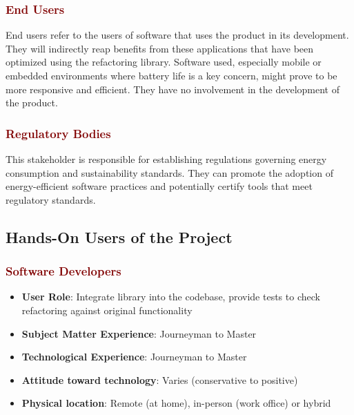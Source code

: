 \documentclass[12pt]{article}
\begin{document}
\subsubsection*{\textcolor{Maroon}{End Users}}
End users refer to the users of software that uses the product in its development. They will indirectly reap benefits from these applications that have been optimized using the refactoring library. Software used, especially mobile or embedded environments where battery life is a key concern, might prove to be more responsive and efficient. They have no involvement in the development of the product. 

\subsubsection*{\textcolor{Maroon}{Regulatory Bodies}}
This stakeholder is responsible for establishing regulations governing energy consumption and sustainability standards. They can promote the adoption of energy-efficient software practices and potentially certify tools that meet regulatory standards. 

\subsection{Hands-On Users of the Project}
\subsubsection*{\textcolor{Maroon}{Software Developers}}
\begin{itemize}
  \item \textbf{User Role}: Integrate library into the codebase, provide tests to check refactoring against original functionality

  \item \textbf{Subject Matter Experience}: Journeyman to Master
  
  \item \textbf{Technological Experience}: Journeyman to Master
  
  \item \textbf{Attitude toward technology}: Varies (conservative to positive)
  
  \item \textbf{Physical location}: Remote (at home), in-person (work office) or hybrid
\end{itemize}
\end{document}

